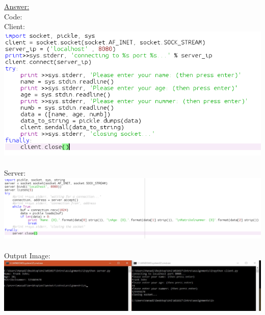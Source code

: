 \documentclass{WeSTassignment}
\begin{document}
\underline{Answer:} \\
Code: \\
Client: \\
\includegraphics[width=1\textwidth]{images/code1.png} \\ \\
Server: \\
\includegraphics[width=1\textwidth]{images/code2_server.png} \\ \\
Output Image: \\
\includegraphics[width=1\textwidth]{images/output_pic.png} \\ \\

\makefooter
\end{document}
